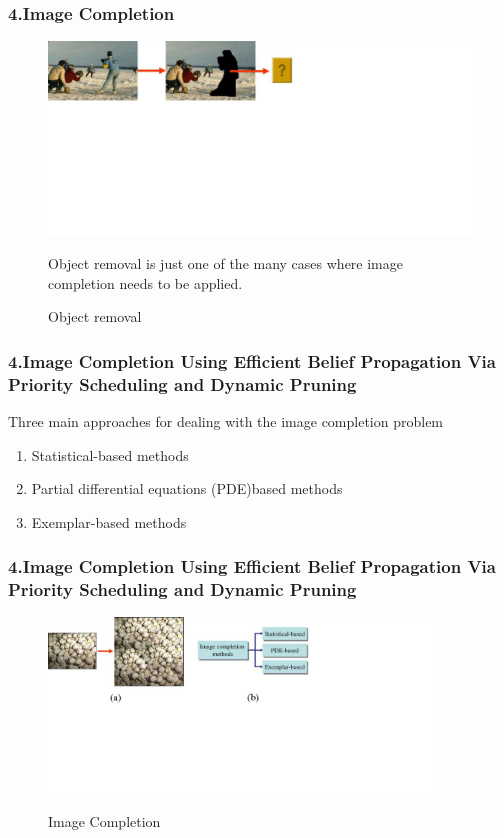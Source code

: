 \documentclass{beamer}
\begin{document}
\begin{frame}
\frametitle{\textbf{4.Image Completion }}
\begin{figure}
  \includegraphics[width=5in]{prune1.pdf}\\
  \caption{Object removal}\label{}
Object removal is just one of the many cases where image completion
needs to be applied.
\end{figure}
\end{frame}

\begin{frame}
\frametitle{\textbf{4.Image Completion Using Efficient Belief Propagation
Via Priority Scheduling and Dynamic Pruning}}
 Three main approaches  for dealing with the image completion problem
\begin{enumerate}
  \item Statistical-based methods
  \item Partial differential equations (PDE)based methods
  \item Exemplar-based methods
\end{enumerate}
\end{frame}
\begin{frame}
\frametitle{\textbf{4.Image Completion Using Efficient Belief Propagation
Via Priority Scheduling and Dynamic Pruning}}
\begin{figure}
  \includegraphics[width=4in]{prune2.pdf}\\
  \caption{Image Completion}\label{}
\end{figure}
\end{frame}
\end{document}

